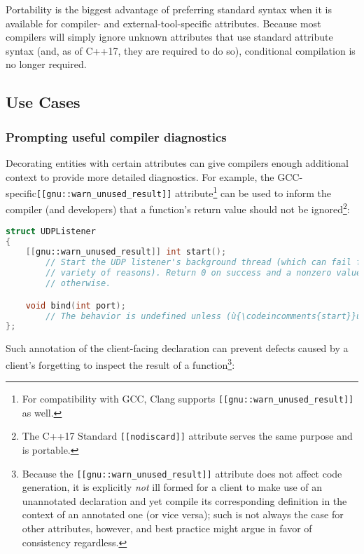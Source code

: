 Portability is the biggest advantage of preferring standard syntax when it is available for compiler- and external-tool-specific attributes. Because most compilers will simply ignore unknown attributes that use standard attribute syntax (and, as of C++17, they are required to do so), conditional compilation is no longer required.

\subsection[Use Cases]{Use Cases}\label{attribute-use-cases}

\subsubsection[Prompting useful compiler diagnostics]{Prompting useful compiler diagnostics}\label{eliciting-useful-compiler-diagnostics}

Decorating entities with certain attributes can give compilers enough
additional context to provide more detailed diagnostics. For example,
the GCC-specific\linebreak[4] \texttt{[[gnu::warn\_unused\_result]]}
attribute{\cprotect\footnote{For compatibility with GCC,
Clang supports \texttt{[[gnu::warn\_unused\_result]]} as
  well.}} can be used to inform the compiler (and developers) that a
function's return value should not be ignored{\cprotect\footnote{The
C++17 Standard \texttt{[[nodiscard]]} attribute serves the same
  purpose and is portable.}}:

\begin{lstlisting}[language=C++]
struct UDPListener
{
    [[gnu::warn_unused_result]] int start();
        // Start the UDP listener's background thread (which can fail for a
        // variety of reasons). Return 0 on success and a nonzero value
        // otherwise.

    void bind(int port);
        // The behavior is undefined unless (ù{\codeincomments{start}}ù) was called successfully.
};
\end{lstlisting}

\noindent Such annotation of the client-facing declaration can prevent defects
caused by a client's forgetting to inspect the result of a
function{\cprotect\footnote{Because the
\texttt{[[gnu::warn\_unused\_result]]} attribute does not affect code
generation, it is explicitly \emph{not} ill formed for a client to
make use of an unannotated declaration and yet compile its
corresponding definition in the context of an annotated one (or vice
versa); such is not always the case for other attributes, however, and
  best practice might argue in favor of consistency regardless.}}:

